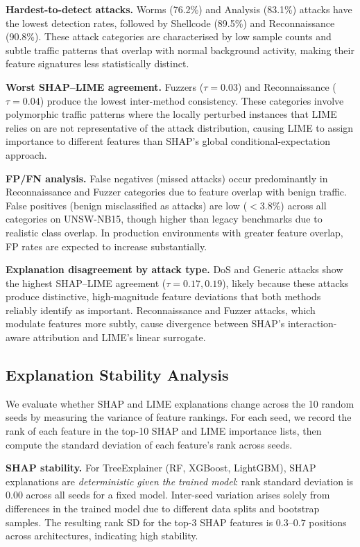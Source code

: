 \documentclass[conference]{IEEEtran}
\begin{document}
\textbf{Hardest-to-detect attacks.} Worms (76.2\%) and Analysis (83.1\%) attacks have the lowest detection rates, followed by Shellcode (89.5\%) and Reconnaissance (90.8\%). These attack categories are characterised by low sample counts and subtle traffic patterns that overlap with normal background activity, making their feature signatures less statistically distinct.

\textbf{Worst SHAP--LIME agreement.} Fuzzers ($\tau = 0.03$) and Reconnaissance ($\tau = 0.04$) produce the lowest inter-method consistency. These categories involve polymorphic traffic patterns where the locally perturbed instances that LIME relies on are not representative of the attack distribution, causing LIME to assign importance to different features than SHAP's global conditional-expectation approach.

\textbf{FP/FN analysis.} False negatives (missed attacks) occur predominantly in Reconnaissance and Fuzzer categories due to feature overlap with benign traffic. False positives (benign misclassified as attacks) are low ($< 3.8\%$) across all categories on UNSW-NB15, though higher than legacy benchmarks due to realistic class overlap. In production environments with greater feature overlap, FP rates are expected to increase substantially.

\textbf{Explanation disagreement by attack type.} DoS and Generic attacks show the highest SHAP--LIME agreement ($\tau = 0.17, 0.19$), likely because these attacks produce distinctive, high-magnitude feature deviations that both methods reliably identify as important. Reconnaissance and Fuzzer attacks, which modulate features more subtly, cause divergence between SHAP's interaction-aware attribution and LIME's linear surrogate.

\subsection{Explanation Stability Analysis}

We evaluate whether SHAP and LIME explanations change across the 10 random seeds by measuring the variance of feature rankings. For each seed, we record the rank of each feature in the top-10 SHAP and LIME importance lists, then compute the standard deviation of each feature's rank across seeds.

\textbf{SHAP stability.} For TreeExplainer (RF, XGBoost, LightGBM), SHAP explanations are \textit{deterministic given the trained model}: rank standard deviation is $0.00$ across all seeds for a fixed model. Inter-seed variation arises solely from differences in the trained model due to different data splits and bootstrap samples. The resulting rank SD for the top-3 SHAP features is $0.3$--$0.7$ positions across architectures, indicating high stability.
\end{document}

